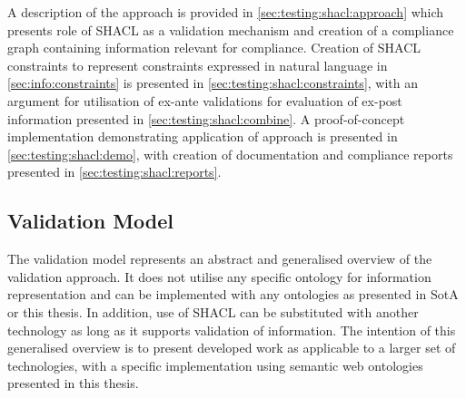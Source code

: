 A description of the approach is provided in \autoref{sec:testing:shacl:approach} which presents role of SHACL as a validation mechanism and creation of a compliance graph containing information relevant for compliance. Creation of SHACL constraints to represent constraints expressed in natural language in \autoref{sec:info:constraints} is presented in \autoref{sec:testing:shacl:constraints}, with an argument for utilisation of ex-ante validations for evaluation of ex-post information presented in \autoref{sec:testing:shacl:combine}.
A proof-of-concept implementation demonstrating application of approach is presented in \autoref{sec:testing:shacl:demo}, with creation of documentation and compliance reports presented in \autoref{sec:testing:shacl:reports}.

\subsection{Validation Model}\label{sec:testing:shacl:approach}
The validation model represents an abstract and generalised overview of the validation approach. It does not utilise any specific ontology for information representation and can be implemented with any ontologies as presented in SotA or this thesis. In addition, use of SHACL can be substituted with another technology as long as it supports validation of information.
The intention of this generalised overview is to present developed work as applicable to a larger set of technologies, with a specific implementation using semantic web ontologies presented in this thesis.

